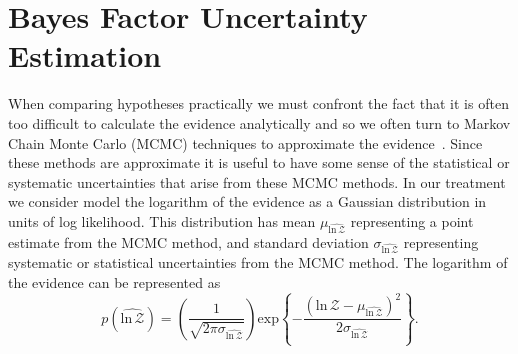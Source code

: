 \section{Bayes Factor Uncertainty Estimation}\label{sec:practical_bayes}
When comparing hypotheses practically we must confront the fact that it is often too difficult to calculate the evidence analytically and so we often turn to Markov Chain Monte Carlo (MCMC) techniques to approximate the evidence~\cite{kass1995bayes, read2006encyclopedia, hobson2010bayesian, wall2012practical}. Since these methods are approximate it is useful to have some sense of the statistical or systematic uncertainties that arise from these MCMC methods\cite{hobson2010bayesian}. In our treatment we consider model the logarithm of the evidence as a Gaussian distribution in units of log likelihood. This distribution has mean $\mu_{\widehat{\mathrm{ln} \, \mathcal{Z}}}$ representing a point estimate from the MCMC method, and standard deviation $\sigma_{\widehat{\mathrm{ln} \, \mathcal{Z}}}$ representing systematic or statistical uncertainties from the MCMC method. The logarithm of the evidence can be represented as 
\begin{equation}\label{eqn:p_log_z}
    p(\widehat{\mathrm{ln} \, \mathcal{Z}}) = \left(\frac{1}{\sqrt{2 \pi \sigma_{\widehat{\mathrm{ln} \, \mathcal{Z}}}}} \right) \mathrm{exp} \left \{-\frac{\left(\mathrm{ln} \, \mathcal{Z} - \mu_{\widehat{\mathrm{ln} \, \mathcal{Z}}}\right)^2} {2 \sigma_{\widehat{\mathrm{ln} \, \mathcal{Z}}}}  \right\}.
\end{equation}

